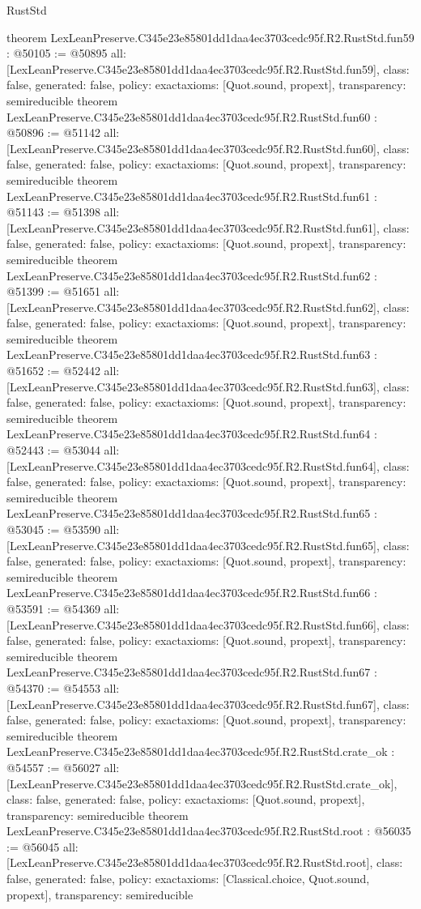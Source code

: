 \begin{lexlean}{RustStd}
\begin{coremodule}
{}
theorem LexLeanPreserve.C345e23e85801dd1daa4ec3703cedc95f.R2.RustStd.fun59 : @50105 := @50895 {
  all: [LexLeanPreserve.C345e23e85801dd1daa4ec3703cedc95f.R2.RustStd.fun59],
  class: false,
  generated: false,
  policy: exact{axioms: [Quot.sound, propext]},
  transparency: semireducible
}
theorem LexLeanPreserve.C345e23e85801dd1daa4ec3703cedc95f.R2.RustStd.fun60 : @50896 := @51142 {
  all: [LexLeanPreserve.C345e23e85801dd1daa4ec3703cedc95f.R2.RustStd.fun60],
  class: false,
  generated: false,
  policy: exact{axioms: [Quot.sound, propext]},
  transparency: semireducible
}
theorem LexLeanPreserve.C345e23e85801dd1daa4ec3703cedc95f.R2.RustStd.fun61 : @51143 := @51398 {
  all: [LexLeanPreserve.C345e23e85801dd1daa4ec3703cedc95f.R2.RustStd.fun61],
  class: false,
  generated: false,
  policy: exact{axioms: [Quot.sound, propext]},
  transparency: semireducible
}
theorem LexLeanPreserve.C345e23e85801dd1daa4ec3703cedc95f.R2.RustStd.fun62 : @51399 := @51651 {
  all: [LexLeanPreserve.C345e23e85801dd1daa4ec3703cedc95f.R2.RustStd.fun62],
  class: false,
  generated: false,
  policy: exact{axioms: [Quot.sound, propext]},
  transparency: semireducible
}
theorem LexLeanPreserve.C345e23e85801dd1daa4ec3703cedc95f.R2.RustStd.fun63 : @51652 := @52442 {
  all: [LexLeanPreserve.C345e23e85801dd1daa4ec3703cedc95f.R2.RustStd.fun63],
  class: false,
  generated: false,
  policy: exact{axioms: [Quot.sound, propext]},
  transparency: semireducible
}
theorem LexLeanPreserve.C345e23e85801dd1daa4ec3703cedc95f.R2.RustStd.fun64 : @52443 := @53044 {
  all: [LexLeanPreserve.C345e23e85801dd1daa4ec3703cedc95f.R2.RustStd.fun64],
  class: false,
  generated: false,
  policy: exact{axioms: [Quot.sound, propext]},
  transparency: semireducible
}
theorem LexLeanPreserve.C345e23e85801dd1daa4ec3703cedc95f.R2.RustStd.fun65 : @53045 := @53590 {
  all: [LexLeanPreserve.C345e23e85801dd1daa4ec3703cedc95f.R2.RustStd.fun65],
  class: false,
  generated: false,
  policy: exact{axioms: [Quot.sound, propext]},
  transparency: semireducible
}
theorem LexLeanPreserve.C345e23e85801dd1daa4ec3703cedc95f.R2.RustStd.fun66 : @53591 := @54369 {
  all: [LexLeanPreserve.C345e23e85801dd1daa4ec3703cedc95f.R2.RustStd.fun66],
  class: false,
  generated: false,
  policy: exact{axioms: [Quot.sound, propext]},
  transparency: semireducible
}
theorem LexLeanPreserve.C345e23e85801dd1daa4ec3703cedc95f.R2.RustStd.fun67 : @54370 := @54553 {
  all: [LexLeanPreserve.C345e23e85801dd1daa4ec3703cedc95f.R2.RustStd.fun67],
  class: false,
  generated: false,
  policy: exact{axioms: [Quot.sound, propext]},
  transparency: semireducible
}
theorem LexLeanPreserve.C345e23e85801dd1daa4ec3703cedc95f.R2.RustStd.crate_ok : @54557 := @56027 {
  all: [LexLeanPreserve.C345e23e85801dd1daa4ec3703cedc95f.R2.RustStd.crate_ok],
  class: false,
  generated: false,
  policy: exact{axioms: [Quot.sound, propext]},
  transparency: semireducible
}
theorem LexLeanPreserve.C345e23e85801dd1daa4ec3703cedc95f.R2.RustStd.root : @56035 := @56045 {
  all: [LexLeanPreserve.C345e23e85801dd1daa4ec3703cedc95f.R2.RustStd.root],
  class: false,
  generated: false,
  policy: exact{axioms: [Classical.choice, Quot.sound, propext]},
  transparency: semireducible
}


\end{coremodule}
\end{lexlean}
